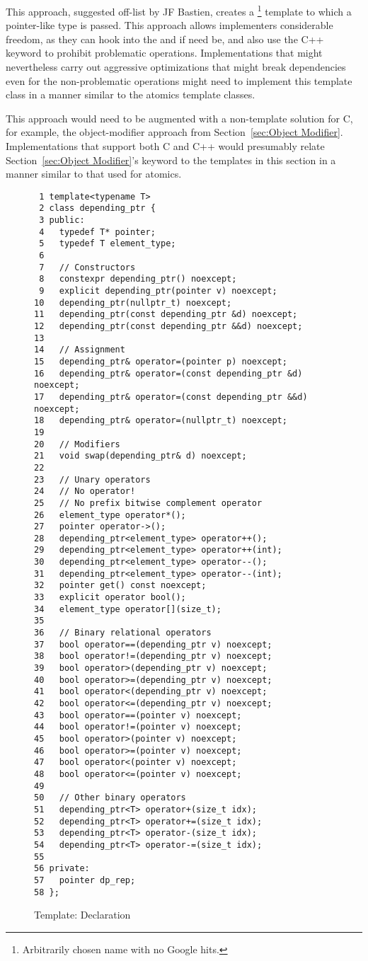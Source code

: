 This approach, suggested off-list by JF Bastien, creates a
\footnote{
	Arbitrarily chosen name with no Google hits.}
template to which a pointer-like type is passed.
This approach allows implementers considerable freedom, as they can
hook into the \co{->} and \co{*} if need be, and also use the C++
 keyword to prohibit problematic operations.
Implementations that might nevertheless carry out aggressive
optimizations that might break dependencies even for the non-problematic
operations might need to implement this template class in a manner
similar to the atomics template classes.

This approach would need to be augmented with a non-template solution
for C, for example, the object-modifier approach from
Section~\ref{sec:Object Modifier}.
Implementations that support both C and C++ would presumably relate
Section~\ref{sec:Object Modifier}'s
keyword to the templates in this section in a manner similar to
that used for atomics.

\begin{figure}[tbp]
{ \scriptsize
\begin{verbatim}
 1 template<typename T>
 2 class depending_ptr {
 3 public:
 4   typedef T* pointer;
 5   typedef T element_type;
 6
 7   // Constructors
 8   constexpr depending_ptr() noexcept;
 9   explicit depending_ptr(pointer v) noexcept;
10   depending_ptr(nullptr_t) noexcept;
11   depending_ptr(const depending_ptr &d) noexcept;
12   depending_ptr(const depending_ptr &&d) noexcept;
13
14   // Assignment
15   depending_ptr& operator=(pointer p) noexcept;
16   depending_ptr& operator=(const depending_ptr &d) noexcept;
17   depending_ptr& operator=(const depending_ptr &&d) noexcept;
18   depending_ptr& operator=(nullptr_t) noexcept;
19
20   // Modifiers
21   void swap(depending_ptr& d) noexcept;
22
23   // Unary operators
24   // No operator!
25   // No prefix bitwise complement operator
26   element_type operator*();
27   pointer operator->();
28   depending_ptr<element_type> operator++();
29   depending_ptr<element_type> operator++(int);
30   depending_ptr<element_type> operator--();
31   depending_ptr<element_type> operator--(int);
32   pointer get() const noexcept;
33   explicit operator bool();
34   element_type operator[](size_t);
35
36   // Binary relational operators
37   bool operator==(depending_ptr v) noexcept;
38   bool operator!=(depending_ptr v) noexcept;
39   bool operator>(depending_ptr v) noexcept;
40   bool operator>=(depending_ptr v) noexcept;
41   bool operator<(depending_ptr v) noexcept;
42   bool operator<=(depending_ptr v) noexcept;
43   bool operator==(pointer v) noexcept;
44   bool operator!=(pointer v) noexcept;
45   bool operator>(pointer v) noexcept;
46   bool operator>=(pointer v) noexcept;
47   bool operator<(pointer v) noexcept;
48   bool operator<=(pointer v) noexcept;
49
50   // Other binary operators
51   depending_ptr<T> operator+(size_t idx);
52   depending_ptr<T> operator+=(size_t idx);
53   depending_ptr<T> operator-(size_t idx);
54   depending_ptr<T> operator-=(size_t idx);
55
56 private:
57   pointer dp_rep;
58 };
\end{verbatim}
}
\caption{Template: Declaration}
\label{fig:Template: Declaration}
\end{figure}

